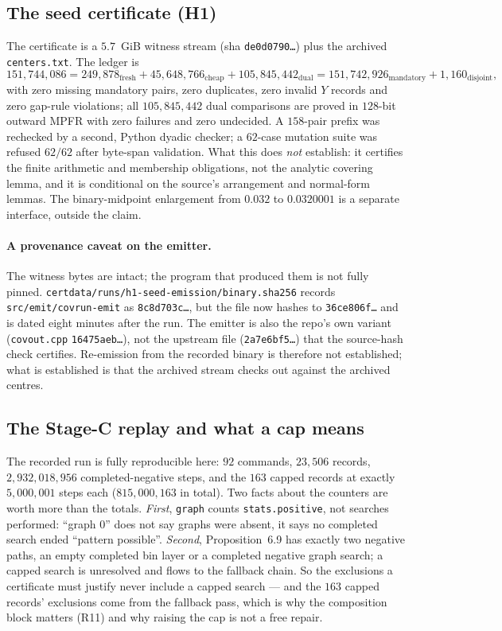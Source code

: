 \documentclass[10pt]{article}
\theoremstyle{definition}
\newcommand{\file}[1]{\texttt{\small #1}}
\begin{document}
\subsection{The seed certificate (H1)}
The certificate is a $5.7$~GiB witness stream (sha \texttt{de0d0790\ldots}) plus the archived
\file{centers.txt}. The ledger is
\[
151{,}744{,}086=249{,}878_{\text{fresh}}+45{,}648{,}766_{\text{cheap}}+105{,}845{,}442_{\text{dual}}
=151{,}742{,}926_{\text{mandatory}}+1{,}160_{\text{disjoint}} ,
\]
with zero missing mandatory pairs, zero duplicates, zero invalid $Y$ records and zero gap-rule
violations; all $105{,}845{,}442$ dual comparisons are proved in $128$-bit outward MPFR with zero
failures and zero undecided. A $158$-pair prefix was rechecked by a second, Python dyadic checker; a
$62$-case mutation suite was refused $62/62$ after byte-span validation. What this does \emph{not}
establish: it certifies the finite arithmetic and membership obligations, not the analytic covering
lemma, and it is conditional on the source's arrangement and normal-form lemmas. The binary-midpoint
enlargement from $0.032$ to $0.0320001$ is a separate interface, outside the claim.

\paragraph{A provenance caveat on the emitter.} The witness bytes are intact; the program that produced
them is not fully pinned. \file{certdata/runs/h1-seed-emission/binary.sha256} records
\file{src/emit/covrun-emit} as \texttt{8c8d703c\ldots}, but the file now hashes to
\texttt{36ce806f\ldots} and is dated eight minutes after the run. The emitter is also the repo's own
variant (\file{covout.cpp} \texttt{16475aeb\ldots}), not the upstream file (\texttt{2a7e6bf5\ldots}) that
the source-hash check certifies. Re-emission from the recorded binary is therefore not established;
what is established is that the archived stream checks out against the archived centres.

\subsection{The Stage-C replay and what a cap means}
The recorded run is fully reproducible here: $92$ commands, $23{,}506$ records, $2{,}932{,}018{,}956$
completed-negative steps, and the $163$ capped records at exactly $5{,}000{,}001$ steps each
($815{,}000{,}163$ in total). Two facts about the counters are worth more than the totals.
\emph{First}, \file{graph} counts \texttt{stats.positive}, not searches performed: ``graph 0'' does not
say graphs were absent, it says no completed search ended ``pattern possible''. \emph{Second},
Proposition~6.9 has exactly two negative paths, an empty completed bin layer or a completed negative
graph search; a capped search is unresolved and flows to the fallback chain. So the exclusions a
certificate must justify never include a capped search --- and the $163$ capped records' exclusions come
from the fallback pass, which is why the composition block matters (R11) and why raising the cap is not
a free repair.
\end{document}

